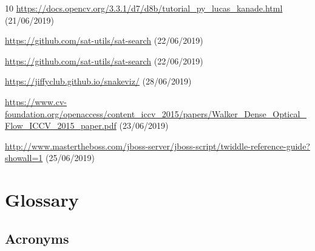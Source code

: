 \documentclass[12pt, a4paper]{report}
\begin{document}
\begin{thebibliography} {10}
				\url{https://docs.opencv.org/3.3.1/d7/d8b/tutorial_py_lucas_kanade.html}
				(21/06/2019)
				
					\url{https://github.com/sat-utils/sat-search}
				(22/06/2019)
				
					\url{https://github.com/sat-utils/sat-search}
				(22/06/2019)
				
				 \url{https://jiffyclub.github.io/snakeviz/} 				(28/06/2019)

					\url{https://www.cv-foundation.org/openaccess/content_iccv_2015/papers/Walker_Dense_Optical_Flow_ICCV_2015_paper.pdf}
				(23/06/2019)
				
					\url{http://www.mastertheboss.com/jboss-server/jboss-script/twiddle-reference-guide?showall=1}
				(25/06/2019)
		
	\end{thebibliography}
	
	
	\appendix %
	
	\chapter{Glossary}
	
	
	\section{Acronyms}
	
\end{document}
